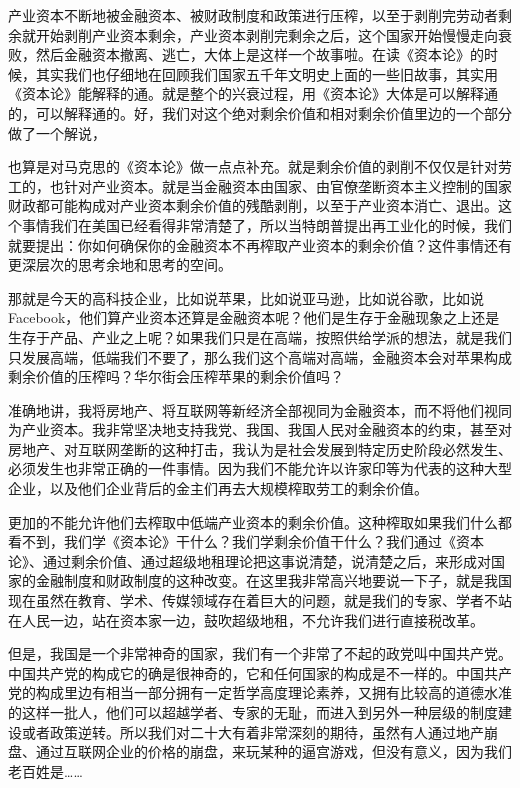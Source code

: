 \documentclass[UTF8, 12pt, a4paper]{ctexrep}
\begin{document}
产业资本不断地被金融资本、被财政制度和政策进行压榨，以至于剥削完劳动者剩余就开始剥削产业资本剩余，产业资本剥削完剩余之后，这个国家开始慢慢走向衰败，然后金融资本撤离、逃亡，大体上是这样一个故事啦。在读《资本论》的时候，其实我们也仔细地在回顾我们国家五千年文明史上面的一些旧故事，其实用《资本论》能解释的通。就是整个的兴衰过程，用《资本论》大体是可以解释通的，可以解释通的。好，我们对这个绝对剩余价值和相对剩余价值里边的一个部分做了一个解说，

也算是对马克思的《资本论》做一点点补充。就是剩余价值的剥削不仅仅是针对劳工的，也针对产业资本。就是当金融资本由国家、由官僚垄断资本主义控制的国家财政都可能构成对产业资本剩余价值的残酷剥削，以至于产业资本消亡、退出。这个事情我们在美国已经看得非常清楚了，所以当特朗普提出再工业化的时候，我们就要提出：你如何确保你的金融资本不再榨取产业资本的剩余价值？这件事情还有更深层次的思考余地和思考的空间。

那就是今天的高科技企业，比如说苹果，比如说亚马逊，比如说谷歌，比如说Facebook，他们算产业资本还算是金融资本呢？他们是生存于金融现象之上还是生存于产品、产业之上呢？如果我们只是在高端，按照供给学派的想法，就是我们只发展高端，低端我们不要了，那么我们这个高端对高端，金融资本会对苹果构成剩余价值的压榨吗？华尔街会压榨苹果的剩余价值吗？

准确地讲，我将房地产、将互联网等新经济全部视同为金融资本，而不将他们视同为产业资本。我非常坚决地支持我党、我国、我国人民对金融资本的约束，甚至对房地产、对互联网垄断的这种打击，我认为是社会发展到特定历史阶段必然发生、必须发生也非常正确的一件事情。因为我们不能允许以许家印等为代表的这种大型企业，以及他们企业背后的金主们再去大规模榨取劳工的剩余价值。

更加的不能允许他们去榨取中低端产业资本的剩余价值。这种榨取如果我们什么都看不到，我们学《资本论》干什么？我们学剩余价值干什么？我们通过《资本论》、通过剩余价值、通过超级地租理论把这事说清楚，说清楚之后，来形成对国家的金融制度和财政制度的这种改变。在这里我非常高兴地要说一下子，就是我国现在虽然在教育、学术、传媒领域存在着巨大的问题，就是我们的专家、学者不站在人民一边，站在资本家一边，鼓吹超级地租，不允许我们进行直接税改革。

但是，我国是一个非常神奇的国家，我们有一个非常了不起的政党叫中国共产党。中国共产党的构成它的确是很神奇的，它和任何国家的构成是不一样的。中国共产党的构成里边有相当一部分拥有一定哲学高度理论素养，又拥有比较高的道德水准的这样一批人，他们可以超越学者、专家的无耻，而进入到另外一种层级的制度建设或者政策逆转。所以我们对二十大有着非常深刻的期待，虽然有人通过地产崩盘、通过互联网企业的价格的崩盘，来玩某种的逼宫游戏，但没有意义，因为我们老百姓是……
\end{document}
